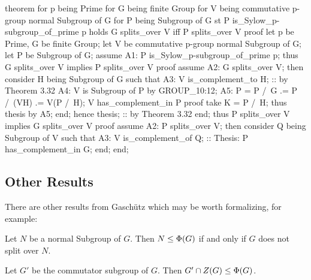 \begin{mizar}
theorem
  for p being Prime
  for G being finite Group
  for V being commutative p-group normal Subgroup of G
  for P being Subgroup of G
  st P is_Sylow_p-subgroup_of_prime p
  holds G splits_over V iff P splits_over V
proof
  let p be Prime, G be finite Group;
  let V be commutative p-group normal Subgroup of G;
  let P be Subgroup of G;
  assume A1: P is_Sylow_p-subgroup_of_prime p;
  thus G splits_over V implies P splits_over V
  proof
    assume A2: G splits_over V;
    then consider H being Subgroup of G such that
    A3: V is_complement_to H; :: by Theorem 3.32
    A4: V is Subgroup of P by GROUP_10:12;
    A5: P = P /\ G
         .= P /\ (VH)
         .= V(P /\ H);
    V has_complement_in P
    proof
      take K = P /\ H;
      thus thesis by A5;
    end;
    hence thesis; :: by Theorem 3.32  
  end;
  thus P splits_over V implies G splits_over V
  proof
    assume A2: P splits_over V;
    then consider Q being Subgroup of V such that
    A3: V is_complement_of Q;
    :: Thesis: P has_complement_in G;
  end;
end;
\end{mizar}

\subsection{Other Results}
There are other results from Gasch\"{u}tz which may be worth
formalizing, for example:

\begin{theorem}
Let $N$ be a normal Subgroup of $G$.
Then $N\leq\Phi(G)$ if and only if $G$ does not split over $N$.
\end{theorem}

\begin{theorem}
Let $G'$ be the commutator subgroup of $G$.
Then $G'\cap Z(G)\leq\Phi(G)$.
\end{theorem}

